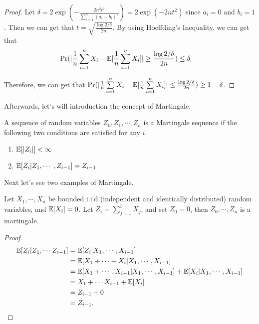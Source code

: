 \documentclass[../main.tex]{subfiles}
\begin{document}
\begin{proof}
	Let $\delta = 2\exp(-\frac{2n^2t^2}{\sum\limits_{i = 1}^n (a_i - b_i)^2}) = 2\exp(-2n t^2)$ since $a_i = 0$ and $b_i = 1$. Then we can get that $t = \sqrt{\frac{\log 2 / \delta}{2n}}$. By using Hoeffding's Inequality, we can get that
	\begin{equation*}
		\begin{aligned}
			\Pr(|\frac{1}{n} \sum\limits_{i=1}^n X_i - \mathbb{E}[\frac{1}{n} \sum\limits_{i = 1}^n X_i]| \geq \frac{\log 2/\delta}{2n}) & \leq  \delta .
		\end{aligned}
	\end{equation*}
	
	Therefore, we can get that $	\Pr(|\frac{1}{n} \sum\limits_{i=1}^n X_i - \mathbb{E}[\frac{1}{n} \sum\limits_{i = 1}^n X_i]| \leq \frac{\log 2/\delta}{2n})  \geq  1 - \delta$.
\end{proof}

Afterwards, let's will introduction the concept of Martingale.

\begin{definition}
	A sequence of random variables $Z_0, Z_1, \cdots, Z_n$ is a Martingale sequence if the following two conditions are satisfied for any $i$
	\begin{enumerate}
		\item $\mathbb{E}[|Z_i|] < \infty$
		\item $\mathbb{E}[Z_i | Z_1, \cdots, Z_{i-1}] = Z_{i-1}$
	\end{enumerate}
\end{definition}

Next let's see two examples of Martingale.

\begin{example}
	Let $X_1, \cdots, X_n$ be bounded i.i.d (independent and identically distributed) random variables, and $\mathbb{E}[X_i] = 0$. Let $Z_i = \sum\limits_{j=1}^i X_j$, and set $Z_0 = 0$, then $Z_0, \cdots, Z_n$ is a martingale.
\end{example}
\begin{proof}
	\begin{equation*}
		\begin{aligned}
		\mathbb{E}[Z_i | Z_1, \cdots Z_{i-1}] & = \mathbb{E}[Z_i | X_1, \cdots, X_{i-1}] \\
		& = \mathbb{E}[X_1 + \cdots + X_i | X_1, \cdots, X_{i-1}] \\
		& = \mathbb{E}[X_1 + \cdots, X_{i-1} | X_1, \cdots, X_{i-1}] + \mathbb{E}[X_i | X_1, \cdots , X_{i-1}] \\
		& = X_1 + \cdots X_{i-1} + \mathbb{E}[X_i]\\
		& = Z_{i-1} + 0 \\
		& = Z_{i-1}.
		\end{aligned}
	\end{equation*}
\end{proof}
\end{document}

